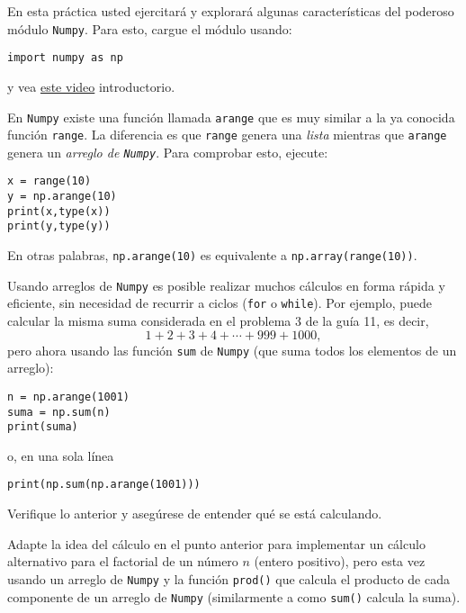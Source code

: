 \documentclass[11pt]{exam}
\begin{document}
\begin{questions}
\item En esta práctica usted ejercitará y explorará algunas características del poderoso módulo \texttt{Numpy}. Para esto, cargue el módulo usando:

\begin{verbatim}
import numpy as np
\end{verbatim}

y vea \href{https://udec.instructure.com/courses/40179/pages/numpy-01}{este video} introductorio.

\item En \texttt{Numpy} existe una función llamada \texttt{arange} que es muy similar a la ya conocida función \texttt{range}. La diferencia es que \texttt{range} genera una \textit{lista} mientras que \texttt{arange} genera un \textit{arreglo de \texttt{Numpy}}. Para comprobar esto, ejecute:

\begin{verbatim}
x = range(10)
y = np.arange(10)
print(x,type(x))
print(y,type(y))
\end{verbatim}

En otras palabras, \texttt{np.arange(10)} es equivalente a \texttt{np.array(range(10))}.

\item Usando arreglos de \texttt{Numpy} es posible realizar muchos cálculos en forma rápida y eficiente, sin necesidad de recurrir a ciclos (\texttt{for} o \texttt{while}). Por ejemplo, puede calcular la misma suma considerada en el problema 3 de la guía 11, es decir, 
\begin{equation}
1 + 2 + 3 + 4  + \cdots + 999 + 1000,
\end{equation}
pero ahora usando las función \texttt{sum} de \texttt{Numpy} (que suma todos los elementos de un arreglo):

\begin{verbatim}
n = np.arange(1001)
suma = np.sum(n)
print(suma)
\end{verbatim}
o, en una sola línea

\begin{verbatim}
print(np.sum(np.arange(1001)))
\end{verbatim}
Verifique lo anterior y asegúrese de entender qué se está calculando.

\item Adapte la idea del cálculo en el punto anterior para implementar un cálculo alternativo para el factorial de un número $n$ (entero positivo), pero esta vez usando un arreglo de \texttt{Numpy} y la función \texttt{prod()} que calcula el producto de cada componente de un arreglo de \texttt{Numpy} (similarmente a como \texttt{sum()} calcula la suma).


\end{questions}
\end{document}

